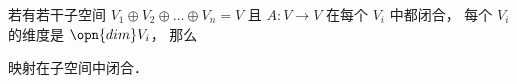 
\begin{issues}
\issueDraft
\end{issues}


若有若干子空间 $V_1 \oplus V_2 \oplus \dots \oplus V_n = V$ 且 $A: V\to V$ 在每个 $V_i$ 中都闭合， 每个 $V_i$ 的维度是 $\opn{dim} V_i$， 那么

映射在子空间中闭合． 
